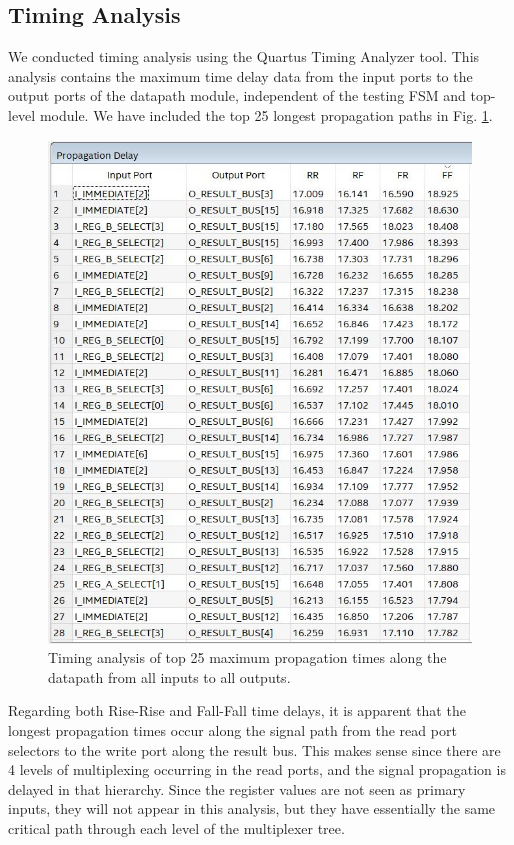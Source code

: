 \documentclass[conference]{IEEEtran}
\begin{document}
\subsection{Timing Analysis}
We conducted timing analysis using the Quartus Timing Analyzer tool. This analysis contains the maximum time delay data from the input ports to the output ports of the datapath module, independent of the testing FSM and top-level module. We have included the top 25 longest propagation paths in Fig. \ref{fig:datapath_timing_table}.
\begin{figure}[h]
    \centering
    \includegraphics[scale=0.6]{resources/figures/timing_analysis_datapath.JPG}
    \caption{Timing analysis of top 25 maximum propagation times along the datapath from all inputs to all outputs.}
    \label{fig:datapath_timing_table}
\end{figure}
Regarding both Rise-Rise and Fall-Fall time delays, it is apparent that the longest propagation times occur along the signal path from the read port selectors to the write port along the result bus. This makes sense since there are 4 levels of multiplexing occurring in the read ports, and the signal propagation is delayed in that hierarchy. Since the register values are not seen as primary inputs, they will not appear in this analysis, but they have essentially the same critical path through each level of the multiplexer tree.
\end{document}
